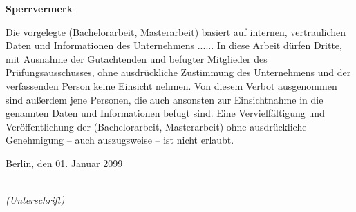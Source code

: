 \thispagestyle{empty}


\vspace*{1cm}

\begin{center}
    \textbf{Sperrvermerk}
\end{center}

\vspace*{1cm}

\noindent 

Die vorgelegte (Bachelorarbeit, Masterarbeit) basiert auf internen, vertraulichen Daten und Informationen des Unternehmens ...... In diese Arbeit dürfen Dritte, mit Ausnahme der Gutachtenden und befugter Mitglieder des Prüfungsausschusses, ohne ausdrückliche Zustimmung des Unternehmens und der verfassenden Person keine Einsicht nehmen. Von diesem Verbot ausgenommen sind außerdem jene Personen, die auch ansonsten zur Einsichtnahme in die genannten Daten und Informationen befugt sind. Eine Vervielfältigung und Veröffentlichung der (Bachelorarbeit, Masterarbeit) ohne ausdrückliche Genehmigung – auch auszugsweise – ist nicht erlaubt.

\vspace{2cm}

\noindent
Berlin, den 01. Januar 2099

\vspace{3cm}

\hspace*{7cm}%
\dotfill\\
\hspace*{8.5cm}%
\textit{(Unterschrift)}